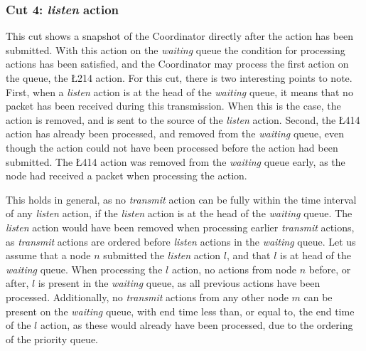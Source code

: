 \subsubsection{Cut 4: \textit{listen} action}
This cut shows a snapshot of the Coordinator directly after the  action has been submitted. With this
action on the \textit{waiting} queue the condition for processing actions has been satisfied, and the
Coordinator may process the first action on the queue, the \L{2}{14} action. For this cut, there is two
interesting points to note. First, when a \textit{listen} action is at the head of the \textit{waiting} queue,
it means that no packet has been received during this transmission. When this is the case, the action is
removed, and \KwNull is sent to the source of the \textit{listen} action. Second, the \L{4}{14} action has
already been processed, and removed from the \textit{waiting} queue, even though the action could not have
been processed before the  action had been submitted. The \L{4}{14} action was removed from the
\textit{waiting} queue early, as the node had received a packet when processing the  action.
\medbreak

This holds in general, as no \textit{transmit} action can be fully within the time interval of any
\textit{listen} action, if the \textit{listen} action is at the head of the \textit{waiting} queue. The
\textit{listen} action would have been removed when processing earlier \textit{transmit} actions, as
\textit{transmit} actions are ordered before \textit{listen} actions in the \textit{waiting} queue. Let us
assume that a node $n$ submitted the \textit{listen} action $l$, and that $l$ is at head of the
\textit{waiting} queue. When processing the $l$ action, no actions from node $n$ before, or after, $l$ is
present in the \textit{waiting} queue, as all previous actions have been processed. Additionally, no
\textit{transmit} actions from any other node $m$ can be present on the \textit{waiting} queue, with end time
less than, or equal to, the end time of the $l$ action, as these would already have been processed, due to the
ordering of the priority queue.

